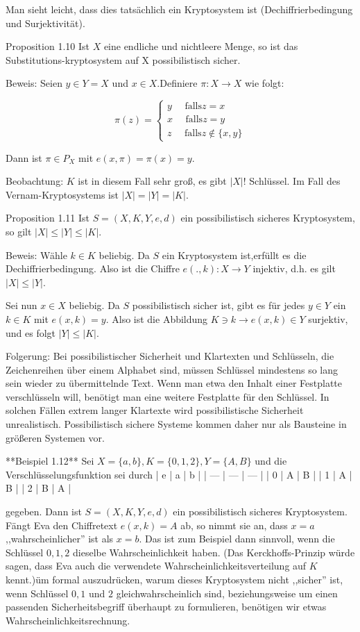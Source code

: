 \documentclass[a4paper]{article}
\begin{document}
\begin{multicols}{3}
    Man sieht leicht, dass dies tatsächlich ein Kryptosystem ist (Dechiffrierbedingung und Surjektivität).

    Proposition 1.10 Ist $X$ eine endliche und nichtleere Menge, so ist das Substitutions-kryptosystem auf X possibilistisch sicher.

    Beweis: Seien $y\in Y =X$ und $x\in X$.Definiere $\pi:X\rightarrow X$ wie folgt:

    $$\pi(z) =\begin{cases} y\quad\text{ falls} z=x\\ x\quad\text{ falls} z=y\\ z\quad\text{ falls} z\not\in\{x,y\} \end{cases}$$

    Dann ist $\pi\in P_X$ mit $e(x,\pi)=\pi(x)=y$.

    Beobachtung: $K$ ist in diesem Fall sehr groß, es gibt $|X|!$ Schlüssel. Im Fall des Vernam-Kryptosystems ist $|X|=|Y|=|K|$.

    Proposition 1.11 Ist $S=(X,K,Y,e,d)$ ein possibilistisch sicheres Kryptosystem, so gilt $|X|\leq|Y|\leq|K|$.

    Beweis: Wähle $k\in K$ beliebig. Da $S$ ein Kryptosystem ist,erfüllt es die Dechiffrierbedingung. Also ist die Chiffre $e(.,k):X\rightarrow Y$ injektiv, d.h. es gilt $|X|\leq |Y|$.

    Sei nun $x\in X$ beliebig. Da $S$ possibilistisch sicher ist, gibt es für jedes $y\in Y$ ein $k\in K$ mit $e(x,k) =y$. Also ist die Abbildung $K\ni k\rightarrow e(x,k)\in Y$ surjektiv, und es folgt $|Y|\leq |K|$.

    Folgerung: Bei possibilistischer Sicherheit und Klartexten und Schlüsseln, die Zeichenreihen über einem Alphabet sind, müssen Schlüssel mindestens so lang sein wieder zu übermittelnde Text. Wenn man etwa den Inhalt einer Festplatte verschlüsseln will, benötigt man eine weitere Festplatte für den Schlüssel. In solchen Fällen extrem langer Klartexte wird possibilistische Sicherheit unrealistisch. Possibilistisch sichere Systeme kommen daher nur als Bausteine in größeren Systemen vor.

    **Beispiel 1.12** Sei $X=\{a,b\},K=\{0,1,2\},Y=\{A,B\}$ und die Verschlüsselungsfunktion sei durch
    | e   | a   | b   |
    | --- | --- | --- |
    | 0   | A   | B   |
    | 1   | A   | B   |
    | 2   | B   | A   |

    gegeben. Dann ist $S=(X,K,Y,e,d)$ ein possibilistisch sicheres Kryptosystem. Fängt Eva den Chiffretext $e(x,k) =A$ ab, so nimmt sie an, dass $x=a$ ,,wahrscheinlicher'' ist als $x=b$.
    Das ist zum Beispiel dann sinnvoll, wenn die Schlüssel $0,1,2$ dieselbe Wahrscheinlichkeit haben.
    (Das Kerckhoffs-Prinzip würde sagen, dass Eva auch die verwendete Wahrscheinlichkeitsverteilung auf $K$ kennt.)üm formal auszudrücken, warum dieses Kryptosystem nicht ,,sicher'' ist, wenn Schlüssel $0,1$ und $2$ gleichwahrscheinlich sind, beziehungsweise um einen passenden Sicherheitsbegriff überhaupt zu formulieren, benötigen wir etwas Wahrscheinlichkeitsrechnung.


\end{multicols}
\end{document}
